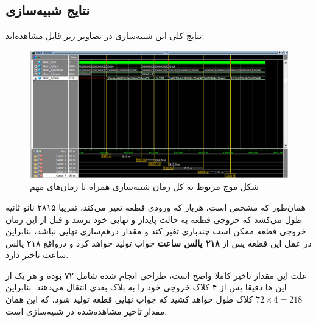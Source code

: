 \subsection{نتایج شبیه‌سازی}
نتایج کلی این شبیه‌سازی در تصاویر زیر قابل مشاهده‌اند:
\begin{figure}[H]
	\centering
	\includegraphics[width=16cm]{../RunData/sim_whole.png}	
	\caption{
	شکل موج مربوط به کل زمان شبیه‌سازی همراه با زمان‌های مهم
	}
\end{figure}
همان‌طور که مشخص است، هر‌بار که ورودی قطعه تغیر می‌کند، تقریبا ۲۸۱۵ نانو ثانیه طول می‌کشد که خروجی قطعه به حالت پایدار و نهایی خود برسد و قبل از این زمان خروجی قطعه ممکن است چندباری تغیر کند و مقدار درهم‌سازی نهایی نباشد، بنابر‌این در عمل این قطعه پس از
\textbf{ ۲۱۸ پالس ساعت }
جواب تولید خواهد کرد و درواقع ۲۱۸ پالس ساعت تاخیر دارد.

علت این مقدار تاخیر کاملا واضح است، طراحی انجام شده شامل ۷۲ 
بوده و هر یک از این 
ها دقیقا پس از ۴ کلاک خروجی خود را به بلاک بعدی انتقال می‌دهند. بنابر‌این
 $72 \times 4 = 218$ 
 کلاک طول خواهد کشید که جواب نهایی قطعه تولید شود، که این همان مقدار تاخیر مشاهده‌شده در شبیه‌سازی است.

